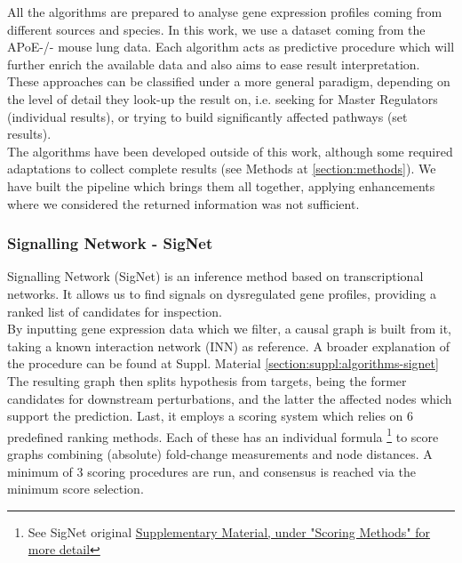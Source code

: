 All the algorithms are prepared to analyse gene expression profiles coming from different sources and species. In this work, we use a dataset coming from the APoE-/- \cite{LoSasso2016TheReduction} mouse lung data. Each algorithm acts as predictive procedure which will further enrich the available data and also aims to ease result interpretation. These approaches can be classified under a more general paradigm, depending on the  level of detail they look-up the result on, i.e. seeking for Master Regulators (individual results), or trying to build significantly affected pathways \cite{Faust2010PathwayExtraction} (set results).
\\

The algorithms have been developed outside of this work, although some required adaptations to collect complete results (see Methods at \ref{section:methods}). We have built the pipeline which brings them all together, applying enhancements where we considered the returned information was not sufficient.
\\

\subsubsection{Signalling Network - SigNet}
\label{back:section:signet}
Signalling Network (SigNet) \cite{Jaeger2014CausalCancer} is an inference method based on transcriptional networks. It allows us to find signals on dysregulated gene profiles, providing a ranked list of candidates for inspection. 
\\

By inputting gene expression data which we filter, a causal graph is built from it, taking a known interaction network (INN) as reference. A broader explanation of the procedure can be found at Suppl. Material \ref{section:suppl:algorithms-signet}
\\

The resulting graph then splits hypothesis from targets, being the former candidates for downstream perturbations, and the latter the affected nodes which support the prediction. Last, it employs a scoring system which relies on 6 predefined ranking methods. Each of these has an individual formula \footnote{See SigNet original \href{https://journals.sagepub.com/doi/suppl/10.1177/1087057114522690/suppl_file/10.1177_1087057114522690.pdf}{Supplementary Material, under "Scoring Methods" for more detail}} to score graphs combining (absolute) fold-change measurements and node distances. A minimum of 3 scoring procedures are run, and consensus is reached via the minimum score selection.

